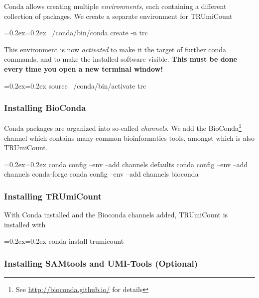 \documentclass[a4paper]{scrartcl}
\newenvironment{shellcode}%
   {\bgroup\topsep=0.2ex\partopsep=0.2ex\shaded\verbatim}%
   {\endverbatim\endshaded\egroup}
\begin{document}
Conda allows creating multiple \emph{environments}, each containing a different collection of packages. We create a separate environment for TRUmiCount

\begin{shellcode}
~/conda/bin/conda create -n trc
\end{shellcode}

This environment is now \emph{activated} to make it the target of further conda commands, and to make the installed software visible. \textbf{This must be done every time you open a new terminal window!}

\begin{shellcode}
source ~/conda/bin/activate trc
\end{shellcode}
\subsubsection*{Installing BioConda}

Conda packages are organized into so-called \emph{channels}. We add the BioConda\footnote{See \url{http://bioconda.github.io/} for details} channel which contains many common bioinformatics tools, amongst which is also TRUmiCount.

\begin{shellcode}
conda config --env --add channels defaults
conda config --env --add channels conda-forge
conda config --env --add channels bioconda
\end{shellcode}

\subsubsection*{Installing TRUmiCount}

With Conda installed and the Bioconda channels added, TRUmiCount is installed with

\begin{shellcode}
conda install trumicount
\end{shellcode}

\subsubsection*{Installing SAMtools and UMI-Tools (Optional)}
\end{document}
